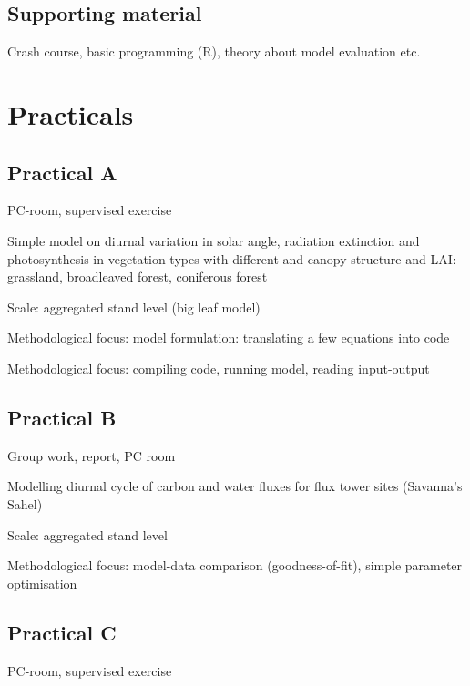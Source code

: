 \documentclass[12pt,oneside]{book}
\begin{document}
\chapter*{Supporting material}\label{supporting-material}

Crash course, basic programming (R), theory about model evaluation etc.

\part{Practicals}\label{part-practicals}

\chapter*{Practical A}\label{practical-a}

PC-room, supervised exercise

Simple model on diurnal variation in solar angle, radiation extinction
and photosynthesis in vegetation types with different and canopy
structure and LAI: grassland, broadleaved forest, coniferous forest

Scale: aggregated stand level (big leaf model)

Methodological focus: model formulation: translating a few equations
into code

Methodological focus: compiling code, running model, reading
input-output

\chapter*{Practical B}\label{practical-b}

Group work, report, PC room

Modelling diurnal cycle of carbon and water fluxes for flux tower sites
(Savanna's Sahel)

Scale: aggregated stand level

Methodological focus: model-data comparison (goodness-of-fit), simple
parameter optimisation

\chapter*{Practical C}\label{practical-c}

PC-room, supervised exercise
\end{document}
